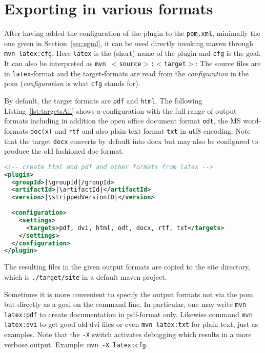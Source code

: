 \section{Exporting in various formats}\label{sec:stableUsage}


After having added the configuration of the plugin to the \texttt{pom.xml},
minimally the one given in Section~\ref{sec:sgml},
it can be used directly invoking maven through 
\texttt{mvn latex:cfg}. 
Here \texttt{latex} is the (short) name of the plugin 
and \texttt{cfg} is the goal. 
It can also be interpreted as \texttt{mvn $<$source$>$:$<$target$>$}: 
The source files are in \texttt{latex}-format and the target-formats 
are read from the {\em configuration\/} in the pom 
({\em configuration\/} is what \texttt{cfg} stands for). 

By default, the target formats are \texttt{pdf} and \texttt{html}. 
The following Listing~\ref{lst:targetsAll} shows a configuration 
with the full range of output formats including in addition 
the open office document format \texttt{odt}, 
the MS word-formats \texttt{doc(x)} and \texttt{rtf} %
and also plain text format \texttt{txt} in utf8 encoding. 
Note that the target \texttt{docx} converts by default into \gls{docx} 
but may also be configured to produce the old fashioned \gls{doc} format. 
%
\begin{lstlisting}[language=xml, basicstyle=\small,
escapechar=|,
float, captionpos=b, label={lst:targetsAll}, 
caption={Configuration with full range output formats}]
<!-- create html and pdf and other formats from latex -->
<plugin>
  <groupId>|\groupId|/groupId>
  <artifactId>|\artifactId|</artifactId>
  <version>|\strippedVersionID|</version>
	
  <configuration>
    <settings>
      <targets>pdf, dvi, html, odt, docx, rtf, txt</targets>
    </settings>
  </configuration>
</plugin>
\end{lstlisting}

The resulting files in the given output formats 
are copied to the site directory, 
which is \texttt{./target/site} in a default maven project. 

Sometimes it is more convenient 
to specify the output formats not via the pom 
but directly as a goal on the command line. 
In particular, one may write \texttt{mvn latex:pdf} to create documentation 
in pdf-format only.
Likewise command \texttt{mvn latex:dvi} to get good old dvi files
or even \texttt{mvn latex:txt} for plain text, just as examples. 
Note that the \texttt{-X} switch activates debugging 
which results in a more verbose output. 
Example: \texttt{mvn -X latex:cfg}. 

